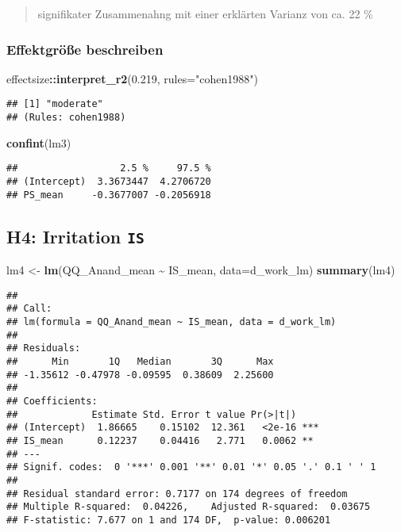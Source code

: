 \documentclass[
]{article}
\newenvironment{Shaded}{\begin{snugshade}}{\end{snugshade}}
\newcommand{\AttributeTok}[1]{\textcolor[rgb]{0.13,0.29,0.53}{#1}}
\newcommand{\FloatTok}[1]{\textcolor[rgb]{0.00,0.00,0.81}{#1}}
\newcommand{\FunctionTok}[1]{\textcolor[rgb]{0.13,0.29,0.53}{\textbf{#1}}}
\newcommand{\NormalTok}[1]{#1}
\newcommand{\OtherTok}[1]{\textcolor[rgb]{0.56,0.35,0.01}{#1}}
\newcommand{\SpecialCharTok}[1]{\textcolor[rgb]{0.81,0.36,0.00}{\textbf{#1}}}
\newcommand{\StringTok}[1]{\textcolor[rgb]{0.31,0.60,0.02}{#1}}
\begin{document}
\begin{quote}
signifikater Zusammenahng mit einer erklärten Varianz von ca. 22 \%
\end{quote}

\subsubsection{Effektgröße
beschreiben}\label{effektgruxf6uxdfe-beschreiben-2}

\begin{Shaded}
\begin{Highlighting}[]
\NormalTok{effectsize}\SpecialCharTok{::}\FunctionTok{interpret\_r2}\NormalTok{(}\FloatTok{0.219}\NormalTok{, }\AttributeTok{rules=}\StringTok{"cohen1988"}\NormalTok{)}
\end{Highlighting}
\end{Shaded}

\begin{verbatim}
## [1] "moderate"
## (Rules: cohen1988)
\end{verbatim}

\begin{Shaded}
\begin{Highlighting}[]
\FunctionTok{confint}\NormalTok{(lm3)}
\end{Highlighting}
\end{Shaded}

\begin{verbatim}
##                  2.5 %     97.5 %
## (Intercept)  3.3673447  4.2706720
## PS_mean     -0.3677007 -0.2056918
\end{verbatim}

\subsection{\texorpdfstring{H4: Irritation
\texttt{IS}}{H4: Irritation IS}}\label{h4-irritation-is}

\begin{Shaded}
\begin{Highlighting}[]
\NormalTok{lm4 }\OtherTok{\textless{}{-}} \FunctionTok{lm}\NormalTok{(QQ\_Anand\_mean }\SpecialCharTok{\textasciitilde{}}\NormalTok{ IS\_mean, }\AttributeTok{data=}\NormalTok{d\_work\_lm)}
\FunctionTok{summary}\NormalTok{(lm4)}
\end{Highlighting}
\end{Shaded}

\begin{verbatim}
## 
## Call:
## lm(formula = QQ_Anand_mean ~ IS_mean, data = d_work_lm)
## 
## Residuals:
##      Min       1Q   Median       3Q      Max 
## -1.35612 -0.47978 -0.09595  0.38609  2.25600 
## 
## Coefficients:
##             Estimate Std. Error t value Pr(>|t|)    
## (Intercept)  1.86665    0.15102  12.361   <2e-16 ***
## IS_mean      0.12237    0.04416   2.771   0.0062 ** 
## ---
## Signif. codes:  0 '***' 0.001 '**' 0.01 '*' 0.05 '.' 0.1 ' ' 1
## 
## Residual standard error: 0.7177 on 174 degrees of freedom
## Multiple R-squared:  0.04226,    Adjusted R-squared:  0.03675 
## F-statistic: 7.677 on 1 and 174 DF,  p-value: 0.006201
\end{verbatim}
\end{document}
